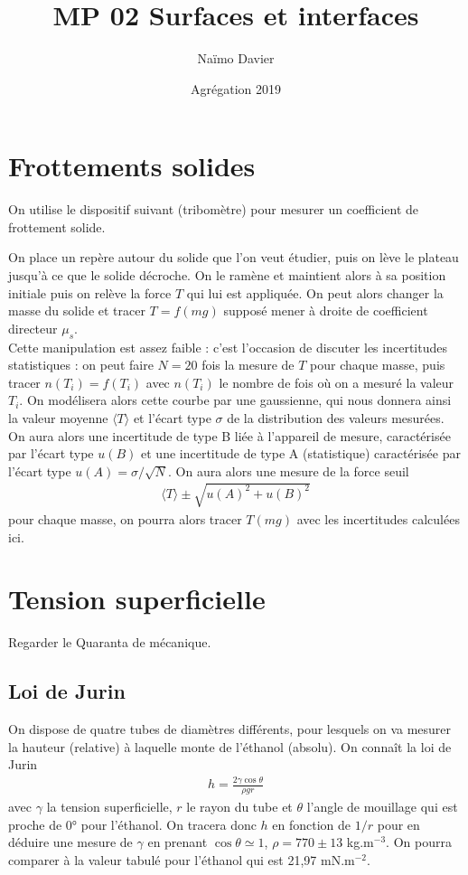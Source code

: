 \documentclass[12pt,prb,aps,epsf]{article}
\begin{document}
	
	\title{MP 02 Surfaces et interfaces}
	\author{Naïmo Davier}
	\date{Agrégation 2019}

	\maketitle
	
	\tableofcontents
	
	\pagebreak
	
	
\section{Frottements solides}
On utilise le dispositif suivant (tribomètre) pour mesurer un coefficient de frottement solide.


On place un repère autour du solide que l'on veut étudier, puis on lève le plateau jusqu'à ce que le solide décroche. On le ramène et maintient alors à sa position initiale puis on relève la force $T$ qui lui est appliquée. On peut alors changer la masse du solide et tracer $T= f(mg)$ supposé mener à droite de coefficient directeur $\mu_s$.\\

Cette manipulation est assez faible : c'est l'occasion de discuter les incertitudes statistiques : on peut faire $N=20$ fois la mesure de $T$ pour chaque masse, puis tracer $n(T_i) = f(T_i)$ avec $n(T_i)$ le nombre de fois où on a mesuré la valeur $T_i$. On modélisera alors cette courbe par une gaussienne, qui nous donnera ainsi la valeur moyenne $\langle T \rangle$ et l'écart type $\sigma$ de la distribution des valeurs mesurées. On aura alors une incertitude de type B liée à l'appareil de mesure, caractérisée par l'écart type $u(B)$ et une incertitude de type A (statistique) caractérisée par l'écart type $u(A) = \sigma/\sqrt{N}$. On aura alors une mesure de la force seuil 
\begin{eqnarray}
\langle T \rangle \pm \sqrt {u(A)^2 + u(B)^2}
\end{eqnarray}
pour chaque masse, on pourra alors tracer $T(mg)$ avec les incertitudes calculées ici.

\section{Tension superficielle}
Regarder le Quaranta de mécanique.

\subsection{Loi de Jurin}
On dispose de quatre tubes de diamètres différents, pour lesquels on va mesurer la hauteur (relative) à laquelle monte de l'éthanol (absolu). On connaît la loi de Jurin 
\begin{eqnarray}
h = \frac{2 \gamma \cos \theta}{\rho g r}
\end{eqnarray}
avec $\gamma$ la tension superficielle, $r$ le rayon du tube et $\theta$ l'angle de mouillage qui est proche de 0° pour l'éthanol. On tracera donc $h$ en fonction de $1/r$ pour en déduire une mesure de $\gamma$ en prenant $\cos \theta \simeq 1$, $\rho = 770 \pm 13$ kg.m$^{-3}$. On pourra comparer à la valeur tabulé pour l'éthanol qui est 21,97 mN.m$^{-2}$.
\end{document}
